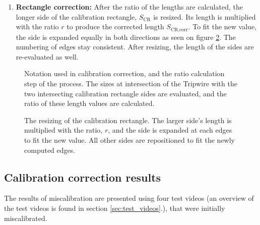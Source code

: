 \begin{enumerate}[align=parleft]
	with $fl(k_{\text{CR}}), fl(K_{\text{CR}})$ being the length values of the fitted line in the intersection points ($k_{\text{CR}}$ and $K_{\text{CR}}$) of the Tripwire.
	These length values correspond to the mean values of the length data stored in the proper rows of the Size Timeline.
	 
	After, the ratio of these two lengths is calculated, quantifying the degree of miscalibration, $r$:
	\begin{displaymath}
		r = \frac{L}{l}.
	\end{displaymath}
	
	The notations used above are illustrated in figure \ref{fig:ratio_calculation}.
	
	\item  \textbf{Rectangle correction:}
	After the ratio of the lengths are calculated, the longer side of the calibration rectangle, $S_{\text{CR}}$ is resized.
	Its length is multiplied with the ratio $r$ to produce the corrected length $S_{\text{CR,corr}}$.
	 To fit the new value, the side is expanded equally in both directions as seen on figure \ref{fig:resizing_cr}. 
	The numbering of edges stay consistent.
	After resizing, the length of the sides are re-evaluated as well.
\end{enumerate}

\begin{figure}[!h]
	\centering
	
	\caption{Notation used in calibration correction, and the ratio calculation step of the process. The sizes at intersection of the Tripwire with the two intersecting calibration rectangle sides are evaluated, and the ratio of these length values are calculated. \label{fig:ratio_calculation}}
\end{figure}

\begin{figure}[!h]
	\centering
	
	\caption{The resizing of the calibration rectangle. The larger side's length is multiplied with the ratio, $r$, and the side is expanded at each edges to fit the new value. All other sides are repositioned to fit the newly computed edges. \label{fig:resizing_cr}}
\end{figure}

\subsection{Calibration correction results}
The results of miscalibration are presented using four test videos (an overview of the test videos is found in section \ref{sec:test_videos}.), that were initially miscalibrated.

